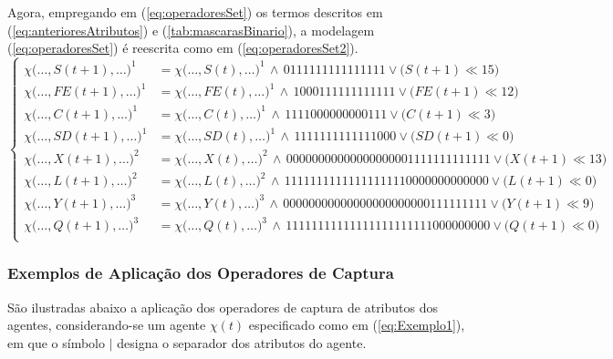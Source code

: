 Agora, empregando em (\ref{eq:operadoresSet}) os termos descritos em (\ref{eq:anterioresAtributos}) e (\ref{tab:mascarasBinario}), a modelagem (\ref{eq:operadoresSet}) é reescrita como em (\ref{eq:operadoresSet2}).
\begin{equation}
 \begin{cases} 
 \chi\big(\dotsc, S(t + 1),  \dotsc \big)^1	&= \chi\big(\dotsc, S(t),  \dotsc \big)^1 \, \wedge \, 0111111111111111 \vee \big(S(t + 1)  \ll 15\big) \\   
 \chi\big(\dotsc, FE(t + 1), \dotsc \big)^1 	&= \chi\big(\dotsc, FE(t), \dotsc \big)^1 \, \wedge \, 1000111111111111 \vee \big(FE(t + 1) \ll 12\big) \\   
 \chi\big(\dotsc, C(t + 1),  \dotsc \big)^1 	&= \chi\big(\dotsc, C(t),  \dotsc \big)^1 \, \wedge \, 1111000000000111 \vee \big(C(t + 1)  \ll 3\big) \\  
 \chi\big(\dotsc, SD(t + 1), \dotsc \big)^1 	&= \chi\big(\dotsc, SD(t), \dotsc \big)^1 \, \wedge \, 1111111111111000 \vee \big(SD(t + 1) \ll 0\big) \\

 \chi\big(\dotsc, X(t + 1), \dotsc \big)^2 	&= \chi\big(\dotsc, X(t), \dotsc \big)^2 \, \wedge \, 00000000000000000001111111111111 \vee \big(X(t + 1) \ll 13\big) \\   
 \chi\big(\dotsc, L(t + 1), \dotsc \big)^2 	&= \chi\big(\dotsc, L(t), \dotsc \big)^2 \, \wedge \, 11111111111111111110000000000000 \vee \big(L(t + 1) \ll 0\big) \\  

 \chi\big(\dotsc, Y(t + 1), \dotsc \big)^3 	&= \chi\big(\dotsc, Y(t), \dotsc \big)^3 \, \wedge \, 00000000000000000000000111111111 \vee \big(Y(t + 1) \ll 9\big) \\   
 \chi\big(\dotsc, Q(t + 1), \dotsc \big)^3 	&= \chi\big(\dotsc, Q(t), \dotsc \big)^3 \, \wedge \, 11111111111111111111111000000000 \vee \big(Q(t + 1) \ll 0\big) \\  
 \end{cases}
 \label{eq:operadoresSet2}
\end{equation}

\newpage

\subsubsection{Exemplos de Aplicação dos Operadores de Captura}

São ilustradas abaixo a aplicação dos operadores de captura de atributos dos agentes, considerando-se um agente $\chi(t)$ especificado como em (\ref{eq:Exemplo1}), em que o símbolo $|$ designa o separador dos atributos do agente. 

